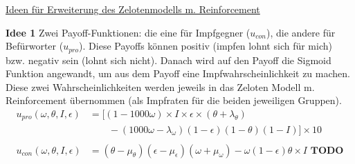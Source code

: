 \documentclass[10pt,a4paper]{article}
\begin{document}
	\begin{center}
		\underline{Ideen für Erweiterung des Zelotenmodells m. Reinforcement}
	\end{center}
\textbf{Idee 1}\newline
Zwei Payoff-Funktionen: die eine für Impfgegner ($u_{con}$), die andere für Befürworter ($u_{pro}$). Diese Payoffs können positiv (impfen lohnt sich für mich) bzw. negativ sein (lohnt sich nicht). Danach wird auf den Payoff die Sigmoid Funktion angewandt, um aus dem Payoff eine Impfwahrscheinlichkeit zu machen. Diese zwei Wahrscheinlichkeiten werden jeweils in das Zeloten Modell m. Reinforcement übernommen (als Impfraten für die beiden jeweiligen Gruppen).
	\begin{align*}
		u_{pro}(\omega, \theta, I, \epsilon) &= [(1-1000\omega) \times I \times \epsilon \times (\theta + \lambda_{\theta}) \\
		&\qquad - (1000\omega - \lambda_{\omega})(1-\epsilon)(1-\theta)(1-I)] \times 10\\
	&\\
		u_{con}(\omega, \theta, I, \epsilon) &= (\theta - \mu_{\theta})(\epsilon - \mu_{\epsilon})(\omega + \mu_{\omega}) - \omega(1-\epsilon)\theta \times I \textbf{   TODO}
	\end{align*}
	
\end{document}
